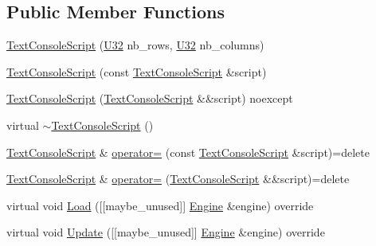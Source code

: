 \subsection*{Public Member Functions}
\begin{DoxyCompactItemize}
\item 
\mbox{\hyperlink{classmage_1_1script_1_1_text_console_script_a5b26c235c08fb2e443ce3f728985a41e}{Text\+Console\+Script}} (\mbox{\hyperlink{namespacemage_a41c104c036fba3756a74e19f793eeaa1}{U32}} nb\+\_\+rows, \mbox{\hyperlink{namespacemage_a41c104c036fba3756a74e19f793eeaa1}{U32}} nb\+\_\+columns)
\item 
\mbox{\hyperlink{classmage_1_1script_1_1_text_console_script_a82c8a2c15aa51befbfe6341e463057db}{Text\+Console\+Script}} (const \mbox{\hyperlink{classmage_1_1script_1_1_text_console_script}{Text\+Console\+Script}} \&script)
\item 
\mbox{\hyperlink{classmage_1_1script_1_1_text_console_script_a46052af67069fef12a8ff9de75cce382}{Text\+Console\+Script}} (\mbox{\hyperlink{classmage_1_1script_1_1_text_console_script}{Text\+Console\+Script}} \&\&script) noexcept
\item 
virtual \mbox{\hyperlink{classmage_1_1script_1_1_text_console_script_af0959c8a4f21bb4f9b5553dffc5710b9}{$\sim$\+Text\+Console\+Script}} ()
\item 
\mbox{\hyperlink{classmage_1_1script_1_1_text_console_script}{Text\+Console\+Script}} \& \mbox{\hyperlink{classmage_1_1script_1_1_text_console_script_a68af2a144f641c9813b333544fe3562a}{operator=}} (const \mbox{\hyperlink{classmage_1_1script_1_1_text_console_script}{Text\+Console\+Script}} \&script)=delete
\item 
\mbox{\hyperlink{classmage_1_1script_1_1_text_console_script}{Text\+Console\+Script}} \& \mbox{\hyperlink{classmage_1_1script_1_1_text_console_script_ae8560dece8d507ee338dda68e3176fed}{operator=}} (\mbox{\hyperlink{classmage_1_1script_1_1_text_console_script}{Text\+Console\+Script}} \&\&script)=delete
\item 
virtual void \mbox{\hyperlink{classmage_1_1script_1_1_text_console_script_a1e5a7bdff2d47b835932d7220a4e2571}{Load}} (\mbox{[}\mbox{[}maybe\+\_\+unused\mbox{]}\mbox{]} \mbox{\hyperlink{classmage_1_1_engine}{Engine}} \&engine) override
\item 
virtual void \mbox{\hyperlink{classmage_1_1script_1_1_text_console_script_ad619f93a946660b30f5e39821778f7b0}{Update}} (\mbox{[}\mbox{[}maybe\+\_\+unused\mbox{]}\mbox{]} \mbox{\hyperlink{classmage_1_1_engine}{Engine}} \&engine) override

\end{DoxyCompactItemize}
